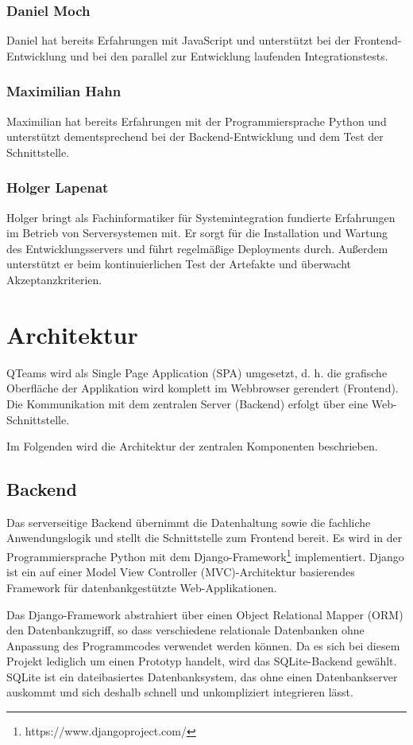 \documentclass[a4paper,11pt,listof=numbered,glossary=totoc,parskip=half,toc=bib]{scrreprt}
\begin{document}
	\subsubsection{Daniel Moch}
	Daniel hat bereits Erfahrungen mit JavaScript und unterstützt bei der Frontend-Entwicklung und bei den parallel zur Entwicklung laufenden Integrationstests.
	
	\subsubsection{Maximilian Hahn}
	Maximilian hat bereits Erfahrungen mit der Programmiersprache Python und unterstützt dementsprechend bei der Backend-Entwicklung und dem Test der Schnittstelle.
	
	\subsubsection{Holger Lapenat}
	Holger bringt als Fachinformatiker für Systemintegration fundierte Erfahrungen im Betrieb von Serversystemen mit. Er sorgt für die Installation und Wartung des Entwicklungsservers und führt regelmäßige Deployments durch. Außerdem unterstützt er beim kontinuierlichen Test der Artefakte und überwacht Akzeptanzkriterien.

	
	\section{Architektur}
		QTeams wird als Single Page Application (SPA) umgesetzt, d. h. die grafische Oberfläche der Applikation wird komplett im Webbrowser gerendert (Frontend). Die Kommunikation mit dem zentralen Server (Backend) erfolgt über eine Web-Schnittstelle.
		
		Im Folgenden wird die Architektur der zentralen Komponenten beschrieben.
		
	\subsection{Backend}
	\label{subsec:backend}
	Das serverseitige Backend übernimmt die Datenhaltung sowie die fachliche Anwendungslogik und stellt die Schnittstelle zum Frontend bereit. Es wird in der Programmiersprache Python mit dem Django-Framework\footnote{https://www.djangoproject.com/} implementiert. Django ist ein auf einer \frqq{}Model View Controller (MVC)\flqq{}-Architektur basierendes Framework für datenbankgestützte Web-Applikationen.
	
	Das Django-Framework abstrahiert über einen Object Relational Mapper (ORM) den Datenbankzugriff, so dass verschiedene relationale Datenbanken ohne Anpassung des Programmcodes verwendet werden können. Da es sich bei diesem Projekt lediglich um einen Prototyp handelt, wird das SQLite-Backend gewählt. SQLite ist ein dateibasiertes Datenbanksystem, das ohne einen Datenbankserver auskommt und sich deshalb schnell und unkompliziert integrieren lässt.
	
\end{document}
